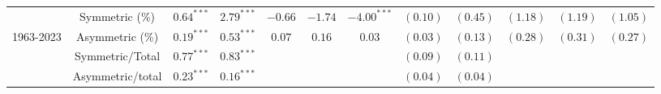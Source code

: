 \begin{tabular}{lccccccccccc}
   & Symmetric (\%) & $0.64^{***}$ & $2.79^{***}$ & $-0.66$ & $-1.74$ & $-4.00^{***}$ & $(0.10)$ & $(0.45)$ & $(1.18)$ & $(1.19)$ & $(1.05)$ \\ 
   \vspace{5pt}1963-2023 & Asymmetric (\%) & $0.19^{***}$ & $0.53^{***}$ & $0.07$ & $0.16$ & $0.03$ & $(0.03)$ & $(0.13)$ & $(0.28)$ & $(0.31)$ & $(0.27)$ \\ 
   & Symmetric/Total & $0.77^{***}$ & $0.83^{***}$ &  &  &  & $(0.09)$ & $(0.11)$ &  &  &  \\ 
   & Asymmetric/total & $0.23^{***}$ & $0.16^{***}$ &  &  &  & $(0.04)$ & $(0.04)$ &  &  &  \\ 
   \bottomrule 
\end{tabular}
